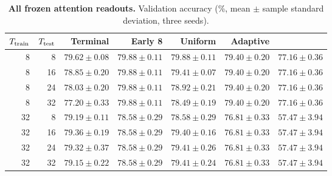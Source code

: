 \begin{table}[htbp]
\centering
\caption{\textbf{All frozen attention readouts.} Validation accuracy (\%, mean $\pm$ sample standard deviation, three seeds).}
\label{tab:attention_readouts}
\small
\begin{tabular}{rrrrrrr}
\toprule
$T_{\rm train}$ & $T_{\rm test}$ & Terminal & Early 8 & Uniform & Adaptive & \grace{} \\
\midrule
8 & 8 & $79.62\pm0.08$ & $79.88\pm0.11$ & $79.88\pm0.11$ & $79.40\pm0.20$ & $77.16\pm0.36$ \\
8 & 16 & $78.85\pm0.20$ & $79.88\pm0.11$ & $79.41\pm0.07$ & $79.40\pm0.20$ & $77.16\pm0.36$ \\
8 & 24 & $78.03\pm0.20$ & $79.88\pm0.11$ & $78.92\pm0.21$ & $79.40\pm0.20$ & $77.16\pm0.36$ \\
8 & 32 & $77.20\pm0.33$ & $79.88\pm0.11$ & $78.49\pm0.19$ & $79.40\pm0.20$ & $77.16\pm0.36$ \\
\midrule
32 & 8 & $79.19\pm0.11$ & $78.58\pm0.29$ & $78.58\pm0.29$ & $76.81\pm0.33$ & $57.47\pm3.94$ \\
32 & 16 & $79.36\pm0.19$ & $78.58\pm0.29$ & $79.40\pm0.16$ & $76.81\pm0.33$ & $57.47\pm3.94$ \\
32 & 24 & $79.32\pm0.37$ & $78.58\pm0.29$ & $79.41\pm0.26$ & $76.81\pm0.33$ & $57.47\pm3.94$ \\
32 & 32 & $79.15\pm0.22$ & $78.58\pm0.29$ & $79.41\pm0.24$ & $76.81\pm0.33$ & $57.47\pm3.94$ \\
\bottomrule
\end{tabular}
\end{table}
